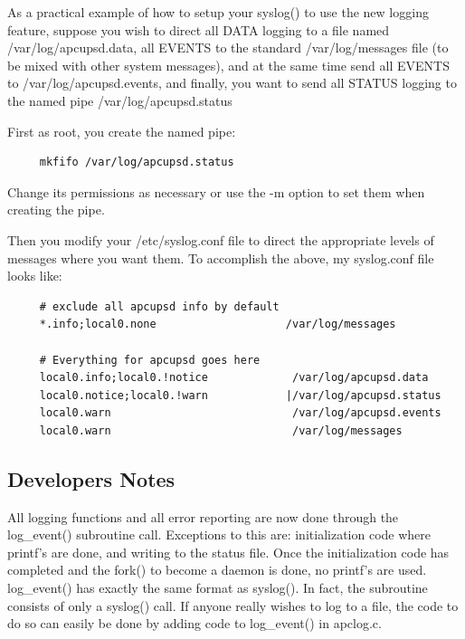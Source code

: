 {{{{{{{As a practical example of how to setup your syslog() to use the new logging
feature, suppose you wish to direct all DATA logging to a file named
/var/log/apcupsd.data, all EVENTS to the standard /var/log/messages file (to
be mixed with other system messages), and at the same time send all EVENTS to
/var/log/apcupsd.events, and finally, you want to send all STATUS logging to
the named pipe /var/log/apcupsd.status  

First as root, you create the named pipe: 

\footnotesize
\begin{verbatim}
     mkfifo /var/log/apcupsd.status
\end{verbatim}
\normalsize

Change its permissions as necessary or use the -m option to set them when
creating the pipe.  

Then you modify your /etc/syslog.conf file to direct the appropriate levels of
messages where you want them. To accomplish the above, my syslog.conf file
looks like: 

\footnotesize
\begin{verbatim}
     # exclude all apcupsd info by default
     *.info;local0.none                    /var/log/messages
     
     # Everything for apcupsd goes here
     local0.info;local0.!notice             /var/log/apcupsd.data
     local0.notice;local0.!warn            |/var/log/apcupsd.status
     local0.warn                            /var/log/apcupsd.events
     local0.warn                            /var/log/messages
\end{verbatim}
\normalsize

\label{Developers-Notes}

\subsection*{Developers Notes}

\label{index-Developers-Notes-169}
All logging functions and all error reporting are now done through the
log\_event() subroutine call. Exceptions to this are: initialization code
where printf's are done, and writing to the status file. Once the
initialization code has completed and the fork() to become a daemon is done,
no printf's are used. log\_event() has exactly the same format as syslog(). In
fact, the subroutine consists of only a syslog() call. If anyone really wishes
to log to a file, the code to do so can easily be done by adding code to
log\_event() in apclog.c. 


}}}}}}}
